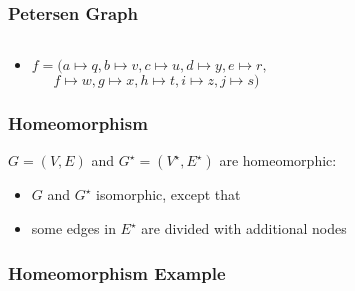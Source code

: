 \documentclass[dvipsnames]{beamer}
\begin{document}
\begin{frame}
  \frametitle{Petersen Graph}

  \begin{columns}
    \begin{center}
    \end{center}

    \begin{center}
    \end{center}
  \end{columns}

  \bigskip
  \begin{itemize}
    \item $f = (a \mapsto q, b \mapsto v, c \mapsto u, d \mapsto y,
        e \mapsto r,$\\
      $~~~~~~~f \mapsto w, g \mapsto x, h \mapsto t, i \mapsto z,
        j \mapsto s)$
  \end{itemize}
\end{frame}

\begin{frame}
  \frametitle{Homeomorphism}

  \begin{definition}
    $G=(V,E)$ and $G^\star=(V^\star,E^\star)$ are \alert{homeomorphic}:
    \begin{itemize}
      \item $G$ and $G^\star$ isomorphic, except that\\
      \item some edges in $E^\star$ are divided with additional nodes
    \end{itemize}
  \end{definition}
\end{frame}

\begin{frame}
  \frametitle{Homeomorphism Example}

  \begin{columns}
    \begin{center}
    \end{center}

    \begin{center}
    \end{center}
  \end{columns}
\end{frame}
\end{document}
